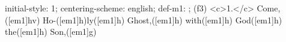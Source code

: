 initial-style: 1;
centering-scheme: english;
def-m1: \grealign;
(f3) <c>1.</c> Come,([em1]hv) Ho-([em1]h)ly([em1]h) Ghost,([em1]h) with([em1]h) God([em1]h) the([em1]h) Son,([em1]g)